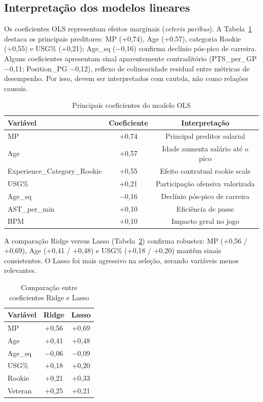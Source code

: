 \documentclass[11pt]{article}
\begin{document}
\subsection{Interpretação dos modelos lineares}

Os coeficientes OLS representam efeitos marginais (\textit{ceteris paribus}). A Tabela~\ref{tab:coef_ols} destaca os principais preditores: MP (+0,74), Age (+0,57), categoria Rookie (+0,55) e USG\% (+0,21); Age\_sq ($-$0,16) confirma declínio pós-pico de carreira. Alguns coeficientes apresentam sinal aparentemente contraditório (PTS\_per\_GP $-$0,11; Position\_PG $-$0,12), reflexo de colinearidade residual entre métricas de desempenho. Por isso, devem ser interpretados com cautela, não como relações causais.

\begin{table}[H]
\centering
\caption{Principais coeficientes do modelo OLS}
\label{tab:coef_ols}
\small
\begin{tabular}{lcc}
\toprule
\textbf{Variável} & \textbf{Coeficiente} & \textbf{Interpretação} \\
\midrule
MP & +0,74 & Principal preditor salarial \\
Age & +0,57 & Idade aumenta salário até o pico \\
Experience\_Category\_Rookie & +0,55 & Efeito contratual rookie scale \\
USG\% & +0,21 & Participação ofensiva valorizada \\
Age\_sq & $-$0,16 & Declínio pós-pico de carreira \\
AST\_per\_min & +0,10 & Eficiência de passe \\
BPM & +0,10 & Impacto geral no jogo \\
\bottomrule
\end{tabular}
\end{table}

A comparação Ridge versus Lasso (Tabela~\ref{tab:ridge_lasso}) confirma robustez: MP (+0,56 / +0,69), Age (+0,41 / +0,48) e USG\% (+0,18 / +0,20) mantêm sinais consistentes. O Lasso foi mais agressivo na seleção, zerando variáveis menos relevantes.

\begin{table}[H]
\centering
\caption{Comparação entre coeficientes Ridge e Lasso}
\label{tab:ridge_lasso}
\small
\begin{tabular}{lcc}
\toprule
\textbf{Variável} & \textbf{Ridge} & \textbf{Lasso} \\
\midrule
MP & +0,56 & +0,69 \\
Age & +0,41 & +0,48 \\
Age\_sq & $-$0,06 & $-$0,09 \\
USG\% & +0,18 & +0,20 \\
Rookie & +0,21 & +0,33 \\
Veteran & +0,25 & +0,21 \\
\bottomrule
\end{tabular}
\end{table}
\end{document}
